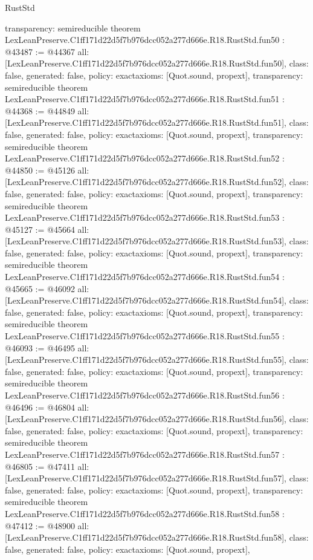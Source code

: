 \begin{lexlean}{RustStd}
\begin{coremodule}
{  transparency: semireducible
}
theorem LexLeanPreserve.C1ff171d22d5f7b976dcc052a277d666e.R18.RustStd.fun50 : @43487 := @44367 {
  all: [LexLeanPreserve.C1ff171d22d5f7b976dcc052a277d666e.R18.RustStd.fun50],
  class: false,
  generated: false,
  policy: exact{axioms: [Quot.sound, propext]},
  transparency: semireducible
}
theorem LexLeanPreserve.C1ff171d22d5f7b976dcc052a277d666e.R18.RustStd.fun51 : @44368 := @44849 {
  all: [LexLeanPreserve.C1ff171d22d5f7b976dcc052a277d666e.R18.RustStd.fun51],
  class: false,
  generated: false,
  policy: exact{axioms: [Quot.sound, propext]},
  transparency: semireducible
}
theorem LexLeanPreserve.C1ff171d22d5f7b976dcc052a277d666e.R18.RustStd.fun52 : @44850 := @45126 {
  all: [LexLeanPreserve.C1ff171d22d5f7b976dcc052a277d666e.R18.RustStd.fun52],
  class: false,
  generated: false,
  policy: exact{axioms: [Quot.sound, propext]},
  transparency: semireducible
}
theorem LexLeanPreserve.C1ff171d22d5f7b976dcc052a277d666e.R18.RustStd.fun53 : @45127 := @45664 {
  all: [LexLeanPreserve.C1ff171d22d5f7b976dcc052a277d666e.R18.RustStd.fun53],
  class: false,
  generated: false,
  policy: exact{axioms: [Quot.sound, propext]},
  transparency: semireducible
}
theorem LexLeanPreserve.C1ff171d22d5f7b976dcc052a277d666e.R18.RustStd.fun54 : @45665 := @46092 {
  all: [LexLeanPreserve.C1ff171d22d5f7b976dcc052a277d666e.R18.RustStd.fun54],
  class: false,
  generated: false,
  policy: exact{axioms: [Quot.sound, propext]},
  transparency: semireducible
}
theorem LexLeanPreserve.C1ff171d22d5f7b976dcc052a277d666e.R18.RustStd.fun55 : @46093 := @46495 {
  all: [LexLeanPreserve.C1ff171d22d5f7b976dcc052a277d666e.R18.RustStd.fun55],
  class: false,
  generated: false,
  policy: exact{axioms: [Quot.sound, propext]},
  transparency: semireducible
}
theorem LexLeanPreserve.C1ff171d22d5f7b976dcc052a277d666e.R18.RustStd.fun56 : @46496 := @46804 {
  all: [LexLeanPreserve.C1ff171d22d5f7b976dcc052a277d666e.R18.RustStd.fun56],
  class: false,
  generated: false,
  policy: exact{axioms: [Quot.sound, propext]},
  transparency: semireducible
}
theorem LexLeanPreserve.C1ff171d22d5f7b976dcc052a277d666e.R18.RustStd.fun57 : @46805 := @47411 {
  all: [LexLeanPreserve.C1ff171d22d5f7b976dcc052a277d666e.R18.RustStd.fun57],
  class: false,
  generated: false,
  policy: exact{axioms: [Quot.sound, propext]},
  transparency: semireducible
}
theorem LexLeanPreserve.C1ff171d22d5f7b976dcc052a277d666e.R18.RustStd.fun58 : @47412 := @48900 {
  all: [LexLeanPreserve.C1ff171d22d5f7b976dcc052a277d666e.R18.RustStd.fun58],
  class: false,
  generated: false,
  policy: exact{axioms: [Quot.sound, propext]},
}
\end{coremodule}
\end{lexlean}
